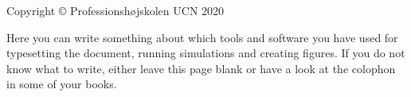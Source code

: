 \thispagestyle{empty}
{\small
\strut\vfill %
\noindent Copyright \copyright{} Professionshøjskolen UCN 2020\par
\vspace{0.2cm}
\noindent Here you can write something about which tools and software you have used for typesetting the document, running simulations and creating figures. If you do not know what to write, either leave this page blank or have a look at the colophon in some of your books.
}
\clearpage